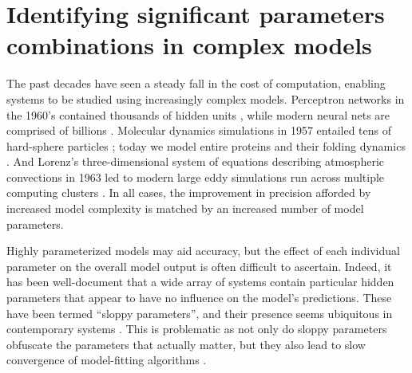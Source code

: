 \chapter{Identifying significant parameters combinations in complex
  models \label{ch:params}}




The past decades have seen a steady fall in the cost of computation,
enabling systems to be studied using increasingly complex models.
Perceptron networks in the 1960's contained thousands of hidden units
\cite{nagy_neural_1991}, while modern neural nets are comprised of
billions \cite{hsu_biggest_2015}. Molecular dynamics simulations in
1957 entailed tens of hard-sphere particles \cite{alder_phase_1957};
today we model entire proteins and their folding dynamics
\cite{piana_atomic-level_2013}. And Lorenz's three-dimensional system
of equations describing atmospheric convections in 1963
\cite{lorenz_deterministic_1963} led to modern large eddy simulations
run across multiple computing clusters \cite{ghosal_dynamic_1995}. In
all cases, the improvement in precision afforded by increased model
complexity is matched by an increased number of model parameters.

Highly parameterized models may aid accuracy, but the effect of each
individual parameter on the overall model output is often difficult to
ascertain. Indeed, it has been well-document that a wide array of
systems contain particular hidden parameters that appear to have no
influence on the model's predictions. These have been termed ``sloppy
parameters'', and their presence seems ubiquitous in contemporary
systems \cite{gutenkunst_extracting_2007}. This is problematic as not
only do sloppy parameters obfuscate the parameters that actually
matter, but they also lead to slow convergence of model-fitting
algorithms \cite{transtrum_geometry_2011}.

